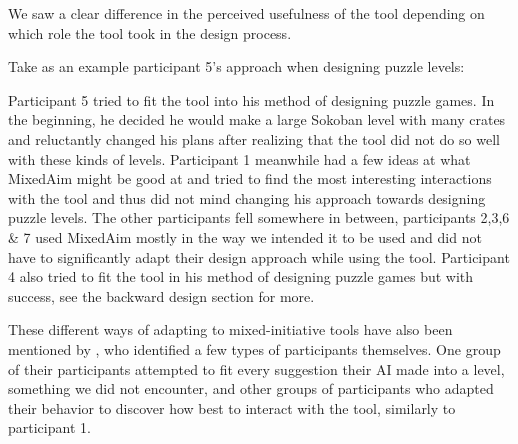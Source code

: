 We saw a clear difference in the perceived usefulness of the tool depending on which role the tool took in the design process.

Take as an example participant 5's approach when designing puzzle levels: \\
\hspace{\dimexpr-\fboxrule-\fboxsep\relax}


Participant 5 tried to fit the tool into his method of designing puzzle games. In the beginning, he decided he would make a large Sokoban level with many crates and reluctantly changed his plans after realizing that the tool did not do so well with these kinds of levels.
Participant 1 meanwhile had a few ideas at what MixedAim might be good at and tried to find the most interesting interactions with the tool and thus did not mind changing his approach towards designing puzzle levels.
The other participants fell somewhere in between, participants 2,3,6 \& 7 used MixedAim mostly in the way we intended it to be used and did not have to significantly adapt their design approach while using the tool. Participant 4 also tried to fit the tool in his method of designing puzzle games but with success, see the backward design section for more.

These different ways of adapting to mixed-initiative tools have also been mentioned by \cite{Guzdial}, who identified a few types of participants themselves.
One group of their participants attempted to fit every suggestion their AI made into a level, something we did not encounter, and other groups of participants who adapted their behavior to discover how best to interact with the tool, similarly to participant 1.

